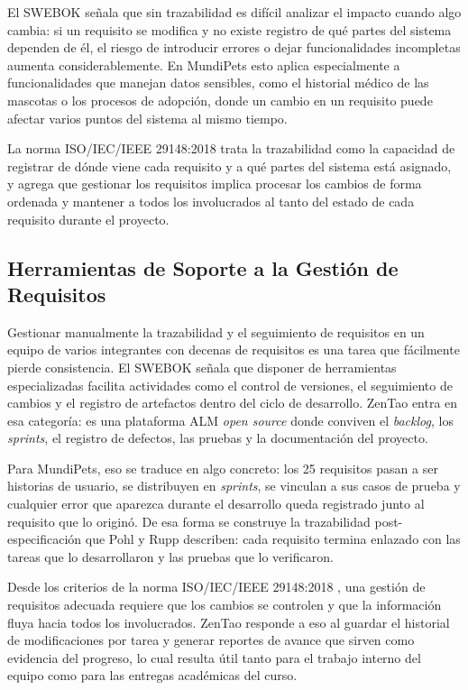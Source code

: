 \documentclass[journal,onecolumn]{IEEEtran}
\begin{document}
El SWEBOK \cite{swebok2024} señala que sin trazabilidad es difícil analizar el impacto cuando
algo cambia: si un requisito se modifica y no existe registro de qué partes del sistema dependen
de él, el riesgo de introducir errores o dejar funcionalidades incompletas aumenta considerablemente.
En MundiPets esto aplica especialmente a funcionalidades que manejan datos sensibles, como el
historial médico de las mascotas o los procesos de adopción, donde un cambio en un requisito puede
afectar varios puntos del sistema al mismo tiempo.

La norma ISO/IEC/IEEE 29148:2018 \cite{iso29148} trata la trazabilidad como la capacidad de
registrar de dónde viene cada requisito y a qué partes del sistema está asignado, y agrega que
gestionar los requisitos implica procesar los cambios de forma ordenada y mantener a todos los
involucrados al tanto del estado de cada requisito durante el proyecto.

\subsection{Herramientas de Soporte a la Gestión de Requisitos}

Gestionar manualmente la trazabilidad y el seguimiento de requisitos en un equipo de varios
integrantes con decenas de requisitos es una tarea que fácilmente pierde consistencia. El SWEBOK
\cite{swebok2024} señala que disponer de herramientas especializadas facilita actividades como el
control de versiones, el seguimiento de cambios y el registro de artefactos dentro del ciclo de
desarrollo. ZenTao entra en esa categoría: es una plataforma ALM \textit{open source} donde
conviven el \textit{backlog}, los \textit{sprints}, el registro de defectos, las pruebas y la
documentación del proyecto.

Para MundiPets, eso se traduce en algo concreto: los 25 requisitos pasan a ser historias de
usuario, se distribuyen en \textit{sprints}, se vinculan a sus casos de prueba y cualquier error
que aparezca durante el desarrollo queda registrado junto al requisito que lo originó. De esa
forma se construye la trazabilidad post-especificación que Pohl y Rupp \cite{pohl2015} describen:
cada requisito termina enlazado con las tareas que lo desarrollaron y las pruebas que lo verificaron.

Desde los criterios de la norma ISO/IEC/IEEE 29148:2018 \cite{iso29148}, una gestión de requisitos
adecuada requiere que los cambios se controlen y que la información fluya hacia todos los involucrados.
ZenTao responde a eso al guardar el historial de modificaciones por tarea y generar reportes de
avance que sirven como evidencia del progreso, lo cual resulta útil tanto para el trabajo interno
del equipo como para las entregas académicas del curso.
\end{document}
